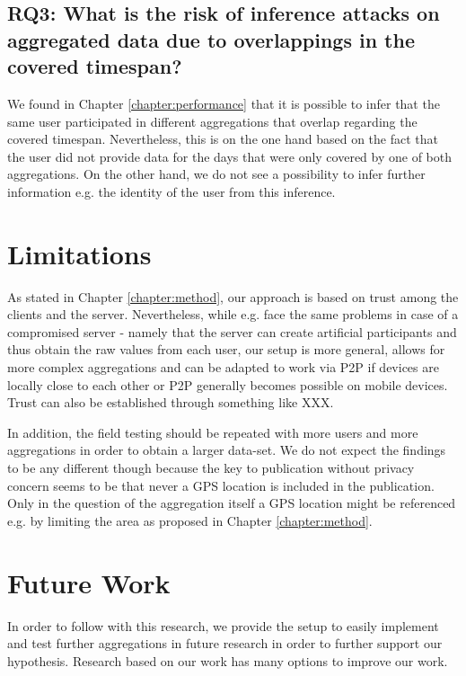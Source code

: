 \subsection*{RQ3: What is the risk of inference attacks on aggregated data due to overlappings in the covered timespan?}
We found in Chapter \ref{chapter:performance} that it is possible to infer that the same user participated in different aggregations that overlap regarding the covered timespan. Nevertheless, this is on the one hand based on the fact that the user did not provide data for the days that were only covered by one of both aggregations. On the other hand, we do not see a possibility to infer further information e.g. the identity of the user from this inference.

\section{Limitations}
As stated in Chapter \ref{chapter:method}, our approach is based on trust among the clients and the server. Nevertheless, while e.g. \parencite{crowdsourcing} face the same problems in case of a compromised server - namely that the server can create artificial participants and thus obtain the raw values from each user, our setup is more general, allows for more complex aggregations and can be adapted to work via P2P if devices are locally close to each other or P2P generally becomes possible on mobile devices. Trust can also be established through something like XXX.

In addition, the field testing should be repeated with more users and more aggregations in order to obtain a larger data-set. We do not expect the findings to be any different though because the key to publication without privacy concern seems to be that never a GPS location is included in the publication. Only in the question of the aggregation itself a GPS location might be referenced e.g. by limiting the area as proposed in Chapter \ref{chapter:method}.

\section{Future Work}
In order to follow with this research, we provide the setup to easily implement and test further aggregations in future research in order to further support our hypothesis.
Research based on our work has many options to improve our work.

